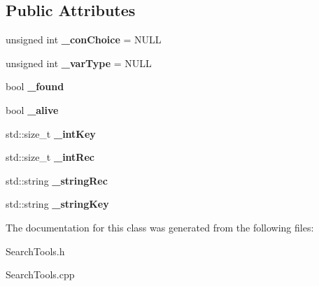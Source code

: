 \subsection*{Public Attributes}
\begin{DoxyCompactItemize}
\item 
\hypertarget{classsearch_tools_a042d217c4ee0f423d459f918df7d4e52}{}unsigned int {\bfseries \+\_\+con\+Choice} = N\+U\+L\+L\label{classsearch_tools_a042d217c4ee0f423d459f918df7d4e52}

\item 
\hypertarget{classsearch_tools_aaf5e2ffcea6777296006d54be4972b9a}{}unsigned int {\bfseries \+\_\+var\+Type} = N\+U\+L\+L\label{classsearch_tools_aaf5e2ffcea6777296006d54be4972b9a}

\item 
\hypertarget{classsearch_tools_a347c312715c636f6b30d9424d4a14e60}{}bool {\bfseries \+\_\+found}\label{classsearch_tools_a347c312715c636f6b30d9424d4a14e60}

\item 
\hypertarget{classsearch_tools_a6e06160b42e73a6e79d13d42b6a36f36}{}bool {\bfseries \+\_\+alive}\label{classsearch_tools_a6e06160b42e73a6e79d13d42b6a36f36}

\item 
\hypertarget{classsearch_tools_ab9031cdf5f301a867c504b5960912166}{}std\+::size\+\_\+t {\bfseries \+\_\+int\+Key}\label{classsearch_tools_ab9031cdf5f301a867c504b5960912166}

\item 
\hypertarget{classsearch_tools_a5d38c76de0683ffcb41c4560b3f0e8fb}{}std\+::size\+\_\+t {\bfseries \+\_\+int\+Rec}\label{classsearch_tools_a5d38c76de0683ffcb41c4560b3f0e8fb}

\item 
\hypertarget{classsearch_tools_a33c186a29a882e4718990c14007eb5f1}{}std\+::string {\bfseries \+\_\+string\+Rec}\label{classsearch_tools_a33c186a29a882e4718990c14007eb5f1}

\item 
\hypertarget{classsearch_tools_a53b3b8b6c233f6f3fea03ad518e5928a}{}std\+::string {\bfseries \+\_\+string\+Key}\label{classsearch_tools_a53b3b8b6c233f6f3fea03ad518e5928a}

\end{DoxyCompactItemize}


The documentation for this class was generated from the following files\+:\begin{DoxyCompactItemize}
\item 
Search\+Tools.\+h\item 
Search\+Tools.\+cpp\end{DoxyCompactItemize}
